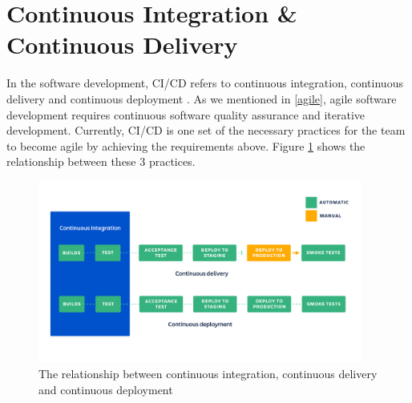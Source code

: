 \section{Continuous Integration \& Continuous Delivery}
In the software development, CI/CD refers to continuous integration, continuous delivery and continuous deployment \cite{pittet2018continuous}. As we mentioned in \ref{agile}, agile software development requires continuous software quality assurance and iterative development. Currently, CI/CD is one set of the necessary practices for the team to become agile by achieving the requirements above. Figure \ref{fig:cicd} shows the relationship between these 3 practices.
\begin{figure}[h]
    \centering
    \includegraphics[width=0.95\textwidth]{pics/cicd.png}
    \caption{The relationship between continuous integration, continuous delivery and continuous deployment \cite{pittet2018continuous}}
    \label{fig:cicd}
\end{figure}
